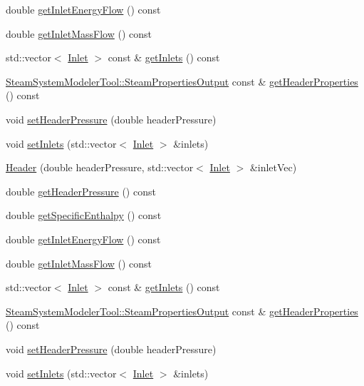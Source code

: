 \begin{DoxyCompactItemize}
\item 
double \hyperlink{class_header_a2a30ee96fa76bab1533cb9ceea0c8af3}{get\+Inlet\+Energy\+Flow} () const
\item 
double \hyperlink{class_header_ad572e6144481b9e9f65004aacebd701c}{get\+Inlet\+Mass\+Flow} () const
\item 
std\+::vector$<$ \hyperlink{class_inlet}{Inlet} $>$ const  \& \hyperlink{class_header_a625d7317488c88c949acd05c72a7c54a}{get\+Inlets} () const
\item 
\hyperlink{struct_steam_system_modeler_tool_1_1_steam_properties_output}{Steam\+System\+Modeler\+Tool\+::\+Steam\+Properties\+Output} const  \& \hyperlink{class_header_a0d27b0e1b3c16cc24b4ba6f64abb7cb0}{get\+Header\+Properties} () const
\item 
void \hyperlink{class_header_a3af0b7964b74287ce0c662b9a88556ed}{set\+Header\+Pressure} (double header\+Pressure)
\item 
void \hyperlink{class_header_ae69b6f894210a6cd340e92222f8bc343}{set\+Inlets} (std\+::vector$<$ \hyperlink{class_inlet}{Inlet} $>$ \&inlets)
\item 
\hyperlink{class_header_a59b836abde0be58bec65ebea1ac67a3b}{Header} (double header\+Pressure, std\+::vector$<$ \hyperlink{class_inlet}{Inlet} $>$ \&inlet\+Vec)
\item 
double \hyperlink{class_header_adc2e6daaf9f5e633c3db96ff3990f1f6}{get\+Header\+Pressure} () const
\item 
double \hyperlink{class_header_af913dbf132f8cb3af6e6b374813acd93}{get\+Specific\+Enthalpy} () const
\item 
double \hyperlink{class_header_a2a30ee96fa76bab1533cb9ceea0c8af3}{get\+Inlet\+Energy\+Flow} () const
\item 
double \hyperlink{class_header_ad572e6144481b9e9f65004aacebd701c}{get\+Inlet\+Mass\+Flow} () const
\item 
std\+::vector$<$ \hyperlink{class_inlet}{Inlet} $>$ const  \& \hyperlink{class_header_a625d7317488c88c949acd05c72a7c54a}{get\+Inlets} () const
\item 
\hyperlink{struct_steam_system_modeler_tool_1_1_steam_properties_output}{Steam\+System\+Modeler\+Tool\+::\+Steam\+Properties\+Output} const  \& \hyperlink{class_header_a0d27b0e1b3c16cc24b4ba6f64abb7cb0}{get\+Header\+Properties} () const
\item 
void \hyperlink{class_header_a3af0b7964b74287ce0c662b9a88556ed}{set\+Header\+Pressure} (double header\+Pressure)
\item 
void \hyperlink{class_header_ae69b6f894210a6cd340e92222f8bc343}{set\+Inlets} (std\+::vector$<$ \hyperlink{class_inlet}{Inlet} $>$ \&inlets)
\end{DoxyCompactItemize}


